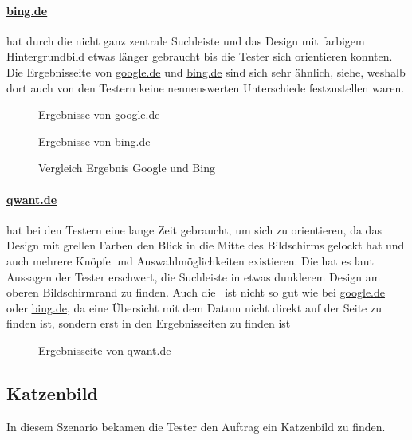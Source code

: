 \paragraph{\url{bing.de}} hat durch die nicht ganz zentrale Suchleiste und das Design mit farbigem Hintergrundbild etwas länger gebraucht bis die Tester sich orientieren konnten.
Die Ergebnisseite von \url{google.de} und \url{bing.de} sind sich sehr ähnlich, siehe, weshalb dort auch von den Testern keine nennenswerten Unterschiede festzustellen waren.\\
\begin{figure}
    \centering
    \begin{minipage}[t]{0.45\linewidth}
        \centering
        Ergebnisse von \url{google.de}
    \end{minipage}%
    \hfill\vrule\hfill
    \begin{minipage}[t]{0.45\linewidth}
        \centering
        Ergebnisse von \url{bing.de}
    \end{minipage}
    \caption{Vergleich Ergebnis Google und Bing}\label{fig:tag_des_internets_results}
\end{figure}

\paragraph{\url{qwant.de}} hat bei den Testern eine lange Zeit gebraucht, um sich zu orientieren,
da das Design mit grellen Farben den Blick in die Mitte des Bildschirms gelockt hat und auch mehrere Knöpfe und Auswahlmöglichkeiten existieren.
Die hat es laut Aussagen der Tester erschwert, die Suchleiste in etwas dunklerem Design am oberen Bildschirmrand zu finden.
Auch die~ ist nicht so gut wie bei \url{google.de} oder \url{bing.de},
da eine Übersicht mit dem Datum nicht direkt auf der Seite zu finden ist,
sondern erst in den Ergebnisseiten zu finden ist
\begin{figure}
    \centering
    \caption{Ergebnisseite von \url{qwant.de}}\label{fig:qwant_tag_des_internets_results}
\end{figure}

\subsection{Katzenbild}\label{subsec:szenario2}
In diesem Szenario bekamen die Tester den Auftrag ein Katzenbild zu finden.

